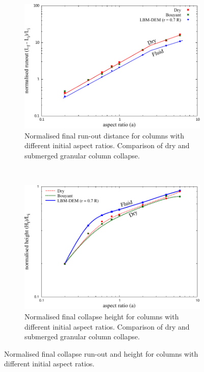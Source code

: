 \begin{figure}
	\centering
\begin{subfigure}[t]{0.9\textwidth}
	\centering
	\includegraphics[width=\textwidth]{runoutf}
	\caption{Normalised final run-out distance for columns with different 
	initial aspect ratios. Comparison of dry and submerged granular column 
	collapse.}
	\label{fig:runoutf}
\end{subfigure}\\
\begin{subfigure}[t]{0.9\textwidth}
	\centering
	\includegraphics[width=\textwidth]{Heightf}
	\caption{Normalised final collapse height for columns with different 
	initial aspect ratios. Comparison of dry and submerged granular column 
	collapse.}
	\label{fig:heightf}
\end{subfigure}
	\caption[Comparison of run-out and height between dry and submerged 
	collapse for columns with different initial aspect ratios]{Normalised final 
	collapse run-out and height for columns with 
	different initial aspect ratios.}
	\label{fig:height_runout_fluid}
\end{figure}


